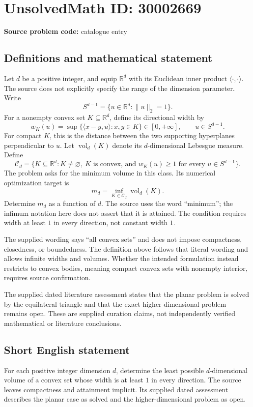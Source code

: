 \documentclass[11pt]{article}
\newcommand{\R}{\mathbb{R}}
\begin{document}
\section*{UnsolvedMath ID: 30002669}
\textbf{Source problem code:} catalogue entry
\subsection{Definitions and mathematical statement}
Let \(d\) be a positive integer, and equip \(\R^d\) with its Euclidean inner product \(\langle\cdot,\cdot\rangle\). The source does not explicitly specify the range of the dimension parameter. Write
\[
S^{d-1}=\{u\in\R^d:\|u\|_2=1\}.
\]
For a nonempty convex set \(K\subseteq\R^d\), define its directional width by
\[
w_K(u)=\sup\{\langle x-y,u\rangle:x,y\in K\}\in[0,+\infty],\qquad u\in S^{d-1}.
\]
For compact \(K\), this is the distance between the two supporting hyperplanes perpendicular to \(u\). Let \(\operatorname{vol}_d(K)\) denote its \(d\)-dimensional Lebesgue measure. Define
\[
\mathcal C_d=\{K\subseteq\R^d:K\ne\varnothing,\ K\text{ is convex, and }w_K(u)\ge1\text{ for every }u\in S^{d-1}\}.
\]
The problem asks for the minimum volume in this class. Its numerical optimization target is
\[
m_d=\inf_{K\in\mathcal C_d}\operatorname{vol}_d(K).
\]
Determine \(m_d\) as a function of \(d\). The source uses the word ``minimum''; the infimum notation here does not assert that it is attained. The condition requires width at least \(1\) in every direction, not constant width \(1\).

The supplied wording says ``all convex sets'' and does not impose compactness, closedness, or boundedness. The definition above follows that literal wording and allows infinite widths and volumes. Whether the intended formulation instead restricts to convex bodies, meaning compact convex sets with nonempty interior, requires source confirmation.

The supplied dated literature assessment states that the planar problem is solved by the equilateral triangle and that the exact higher-dimensional problem remains open. These are supplied curation claims, not independently verified mathematical or literature conclusions.
\subsection{Short English statement}
For each positive integer dimension \(d\), determine the least possible \(d\)-dimensional volume of a convex set whose width is at least \(1\) in every direction. The source leaves compactness and attainment implicit. Its supplied dated assessment describes the planar case as solved and the higher-dimensional problem as open.
\end{document}
